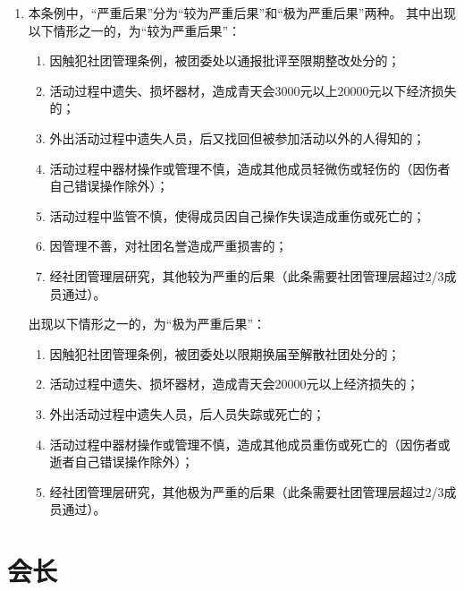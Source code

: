 \begin{enumerate}
    \item 本条例中，“严重后果”分为“较为严重后果”和“极为严重后果”两种。
    其中出现以下情形之一的，为“较为严重后果”：
    \begin{enumerate}
        \item 因触犯社团管理条例，被团委处以通报批评至限期整改处分的；
        \item 活动过程中遗失、损坏器材，造成青天会3000元以上20000元以下经济损失的；
        \item 外出活动过程中遗失人员，后又找回但被参加活动以外的人得知的；
        \item 活动过程中器材操作或管理不慎，造成其他成员轻微伤或轻伤的（因伤者自己错误操作除外）；
        \item 活动过程中监管不慎，使得成员因自己操作失误造成重伤或死亡的；
        \item 因管理不善，对社团名誉造成严重损害的；
        \item 经社团管理层研究，其他较为严重的后果（此条需要社团管理层超过2/3成员通过）。
    \end{enumerate}
    出现以下情形之一的，为“极为严重后果”：
    \begin{enumerate}
        \item 因触犯社团管理条例，被团委处以限期换届至解散社团处分的；
        \item 活动过程中遗失、损坏器材，造成青天会20000元以上经济损失的；
        \item 外出活动过程中遗失人员，后人员失踪或死亡的；
        \item 活动过程中器材操作或管理不慎，造成其他成员重伤或死亡的（因伤者或逝者自己错误操作除外）；
        \item 经社团管理层研究，其他极为严重的后果（此条需要社团管理层超过2/3成员通过）。
    \end{enumerate}
\end{enumerate}

\section{会长}


